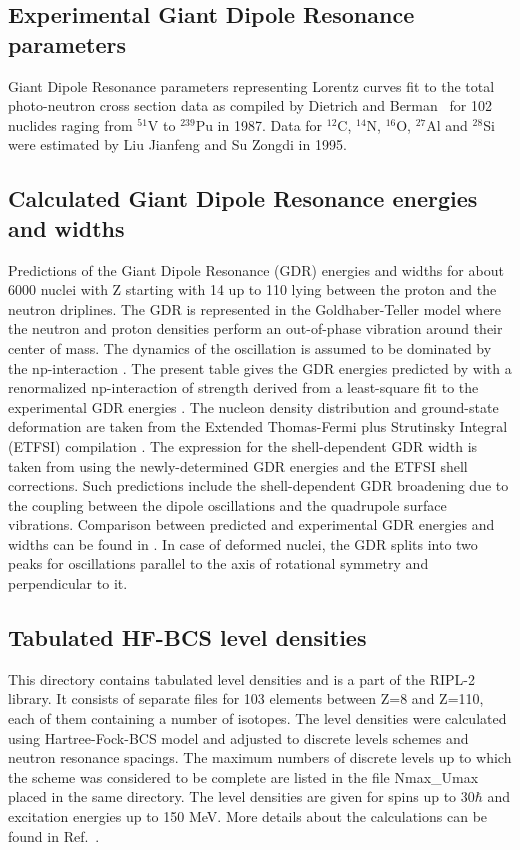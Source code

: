 \documentclass[twocolumn,amsmath,amssymb,10pt,groupedaddress,a4paper]{revtex4}
\begin{document}
\subsection{Experimental Giant Dipole Resonance parameters}
Giant Dipole Resonance parameters representing Lorentz curves fit
to the total photo-neutron cross section data as compiled by Dietrich
and Berman~\cite{die88} for 102 nuclides raging from
$^{51}$V to $^{239}$Pu in 1987. Data for $^{12}$C, $^{14}$N, $^{16}$O, $^{27}$Al and $^{28}$Si
were estimated by Liu Jianfeng and Su Zongdi in 1995.

\subsection{Calculated Giant Dipole Resonance energies and widths}
Predictions of the Giant Dipole Resonance (GDR) energies and widths
for about 6000 nuclei with Z starting with 14 up to 110 lying between
the proton and the neutron driplines. The GDR is represented in the
Goldhaber-Teller model \cite{Goldhaber48} where the neutron and proton
densities perform an out-of-phase vibration around their center of
mass. The dynamics of the oscillation is assumed to be dominated by
the np-interaction \cite{Isacker92}. The present table gives the
GDR energies predicted by \cite{Isacker92} with a renormalized np-interaction
of strength derived from a least-square fit to the experimental GDR
energies \cite{Goriely98}. The nucleon density distribution and ground-state
deformation are taken from the Extended Thomas-Fermi plus Strutinsky
Integral (ETFSI) compilation \cite{Goriely2000,Aboussir95}. The expression
for the shell-dependent GDR width is taken from \cite{Thielemann1983}
using the newly-determined GDR energies and the ETFSI shell corrections.
Such predictions include the shell-dependent GDR broadening due to
the coupling between the dipole oscillations and the quadrupole surface
vibrations. Comparison between predicted and experimental GDR energies
and widths can be found in \cite{Goriely98}. In case of deformed
nuclei, the GDR splits into two peaks for oscillations parallel to
the axis of rotational symmetry and perpendicular to it.

\subsection{Tabulated HF-BCS level densities}
This directory contains tabulated level densities
and is a part of the RIPL-2 library. It consists of separate
files for 103 elements between Z=8 and Z=110, each of them containing
a number of isotopes. The level densities were calculated using Hartree-Fock-BCS
model and adjusted to discrete levels schemes and neutron resonance
spacings. The maximum numbers of discrete levels up to which the scheme
was considered to be complete are listed in the file Nmax\_Umax placed
in the same directory. The level densities are given for spins up
to 30$\hbar$ and excitation energies up to 150 MeV. More details
about the calculations can be found in Ref.~\cite{HFBCS}.
\end{document}
